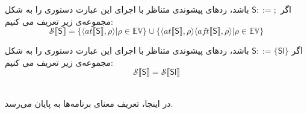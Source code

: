 \begin{defn}
	اگر $         \mathsf{S} ::=;  $ باشد، ردهای پیشوندی متناظر با اجرای این عبارت‌ دستوری را به شکل مجموعه‌ی زیر تعریف می کنیم:
	$$\mathcal{S} \llbracket\mathsf{S}\rrbracket = \{ \langle at\llbracket\mathsf{S}\rrbracket , \rho \rangle | \rho \in \mathbb{EV}       \} \cup     \{ \langle at\llbracket\mathsf{S}\rrbracket , \rho \rangle \langle aft\llbracket\mathsf{S}\rrbracket , \rho \rangle | \rho \in \mathbb{EV}       \}             $$  
	
	
	اگر $         \mathsf{S} ::=\{\mathsf{Sl}\}  $ باشد، ردهای پیشوندی متناظر با اجرای این عبارت‌ دستوری را به شکل مجموعه‌ی زیر تعریف می کنیم:
	$$\mathcal{S} \llbracket\mathsf{S}\rrbracket = \mathcal{S} \llbracket\mathsf{Sl}\rrbracket $$   \\
\end{defn}
در اینجا، تعریف معنای برنامه‌ها به پایان می‌رسد.

